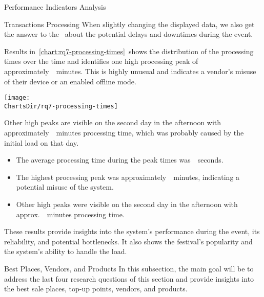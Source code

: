 \begin{section}{Performance Indicators Analysis}
\begin{subsection}{Transactions Processing}
		When slightly changing the displayed data, we also get the answer to the~ about the potential delays and downtimes during the event.


		Results in~\autoref{chart:rq7-processing-times}~shows the distribution of the processing times over the time and identifies one high processing peak of approximately~~minutes.
		This is highly unusual and indicates a vendor's misuse of their device or an enabled offline mode.

		\begin{chart}[h]
			\centering
			\texttt{[image: \\ChartsDir/rq7-processing-times]}
			\caption{ Transaction Processing Times}
			\label{chart:rq7-processing-times}
			\source
		\end{chart}

		Other high peaks are visible on the second day in the afternoon with approximately~~minutes processing time, which was probably caused by the initial load on that day.

		\begin{keytakeaways}
			\begin{itemize}
				\item The average processing time during the peak times was~~seconds.
				\item The highest processing peak was approximately~~minutes, indicating a potential misuse of the system.
				\item Other high peaks were visible on the second day in the afternoon with approx.~~minutes processing time.
			\end{itemize}
		\end{keytakeaways}

		These results provide insights into the system's performance during the event, its reliability, and potential bottlenecks.
		It also shows the festival's popularity and the system's ability to handle the load.

	\end{subsection}

	\begin{subsection}{Best Places, Vendors, and Products}
		\label{subsec:analysis-performance-indicators-best}
		In this subsection, the main goal will be to address the last four research questions of this section and provide insights into the best sale places, top-up points, vendors, and products.


\end{subsection}
\end{section}
